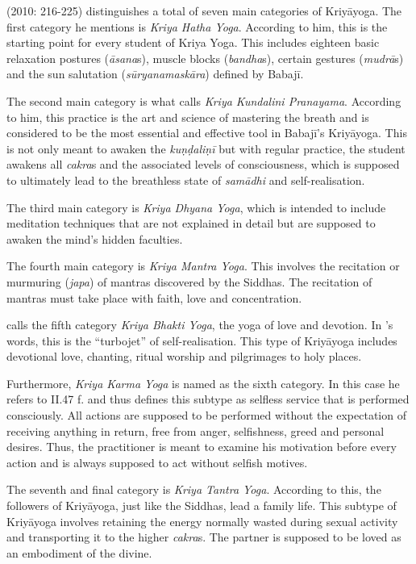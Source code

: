 \citeauthor{govindan2010} (2010: 216-225) distinguishes a total of seven main categories of Kriyāyoga. The first category he mentions is \textit{Kriya Hatha Yoga}. According to him, this is the starting point for every student of Kriya Yoga. This includes eighteen basic relaxation postures (\textit{āsana}s), muscle blocks (\textit{bandha}s), certain gestures (\textit{mudrā}s) and the sun salutation (\textit{sūryanamaskāra}) defined by Babajī.

The second main category is what \citeauthor{govindan2010} calls \textit{Kriya Kundalini Pranayama}. According to him, this practice is the art and science of mastering the breath and is considered to be the most essential and effective tool in Babajī's Kriyāyoga. This is not only meant to awaken the \textit{kuṇḍaliṇī} but with regular practice, the student awakens all \textit{cakra}s and the associated levels of consciousness, which is supposed to ultimately lead to the breathless state of \textit{samādhi} and self-realisation.

The third main category is \textit{Kriya Dhyana Yoga}, which is intended to include meditation techniques that are not explained in detail but are supposed to awaken the mind's hidden faculties.

The fourth main category is \textit{Kriya Mantra Yoga}. This involves the recitation or murmuring (\textit{japa}) of mantras discovered by the Siddhas. The recitation of mantras must take place with faith, love and concentration.

\citeauthor{govindan2010} calls the fifth category \textit{Kriya Bhakti Yoga}, the yoga of love and devotion. In \citeauthor{govindan2010}'s words, this is the ``turbojet'' of self-realisation. This type of Kriyāyoga includes devotional love, chanting, ritual worship and pilgrimages to holy places.

Furthermore, \textit{Kriya Karma Yoga} is named as the sixth category. In this case he refers to  II.47 f. and thus defines this subtype as selfless service that is performed consciously. All actions are supposed to be performed without the expectation of receiving anything in return, free from anger, selfishness, greed and personal desires. Thus, the practitioner is meant to examine his motivation before every action and is always supposed to act without selfish motives.

The seventh and final category is \textit{Kriya Tantra Yoga}. According to this, the followers of Kriyāyoga, just like the Siddhas, lead a family life. This subtype of Kriyāyoga involves retaining the energy normally wasted during sexual activity and transporting it to the higher \textit{cakra}s. The partner is supposed to be loved as an embodiment of the divine.

